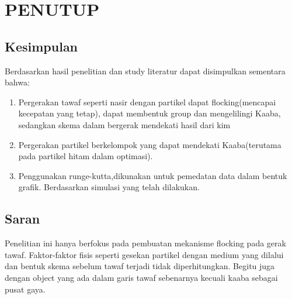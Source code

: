 %
%
\chapter{PENUTUP}\label{cha:penutup}
\section{Kesimpulan}

\hspace{0.5cm} Berdasarkan hasil penelitian dan study literatur dapat disimpulkan sementara bahwa:

\begin{enumerate} 
\item  Pergerakan tawaf seperti nasir dengan partikel dapat flocking(mencapai kecepatan yang tetap), dapat membentuk group dan mengelilingi Kaaba, sedangkan skema dalam bergerak mendekati hasil dari kim
\item  Pergerakan partikel berkelompok yang dapat mendekati Kaaba(terutama pada partikel hitam dalam optimasi). 
\item  Penggunakan runge-kutta,dikunakan untuk pemedatan data dalam bentuk grafik. Berdasarkan simulasi yang telah dilakukan.
\end{enumerate} 


\newpage
\section{Saran}\label{cha:saran}

\hspace{0.5cm} Penelitian ini hanya berfokus pada pembuatan mekanisme flocking pada gerak tawaf. Faktor-faktor fisis seperti gesekan partikel dengan medium yang dilalui dan bentuk skema sebelum tawaf terjadi tidak diperhitungkan. Begitu juga dengan object yang ada dalam garis tawaf sebenarnya kecuali kaaba sebagai pusat gaya. 

%